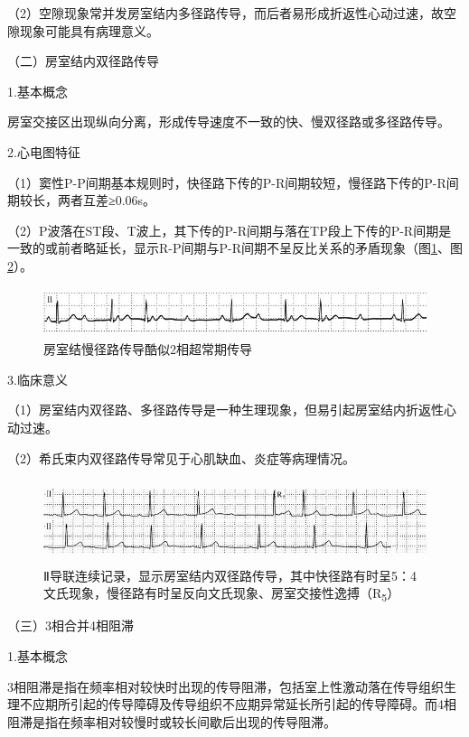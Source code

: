 （2）空隙现象常并发房室结内多径路传导，而后者易形成折返性心动过速，故空隙现象可能具有病理意义。

（二）房室结内双径路传导

1.基本概念

房室交接区出现纵向分离，形成传导速度不一致的快、慢双径路或多径路传导。

2.心电图特征

（1）窦性P-P间期基本规则时，快径路下传的P-R间期较短，慢径路下传的P-R间期较长，两者互差≥0.06s。

（2）P波落在ST段、T波上，其下传的P-R间期与落在TP段上下传的P-R间期是一致的或前者略延长，显示R-P间期与P-R间期不呈反比关系的矛盾现象（图\ref{fig28-14}、图\ref{fig28-15}）。

\begin{figure}[!htbp]
 \centering
 \includegraphics[width=5.39583in,height=0.5625in]{./images/Image00475.jpg}
 \captionsetup{justification=centering}
 \caption{房室结慢径路传导酷似2相超常期传导}
 \label{fig28-14}
  \end{figure} 

3.临床意义

（1）房室结内双径路、多径路传导是一种生理现象，但易引起房室结内折返性心动过速。

（2）希氏束内双径路传导常见于心肌缺血、炎症等病理情况。

\begin{figure}[!htbp]
 \centering
 \includegraphics[width=5.58333in,height=0.95833in]{./images/Image00476.jpg}
 \captionsetup{justification=centering}
 \caption{Ⅱ导联连续记录，显示房室结内双径路传导，其中快径路有时呈5：4文氏现象，慢径路有时呈反向文氏现象、房室交接性逸搏（R\textsubscript{5}）}
 \label{fig28-15}
  \end{figure} 


（三）3相合并4相阻滞

1.基本概念

3相阻滞是指在频率相对较快时出现的传导阻滞，包括室上性激动落在传导组织生理不应期所引起的传导障碍及传导组织不应期异常延长所引起的传导障碍。而4相阻滞是指在频率相对较慢时或较长间歇后出现的传导阻滞。

